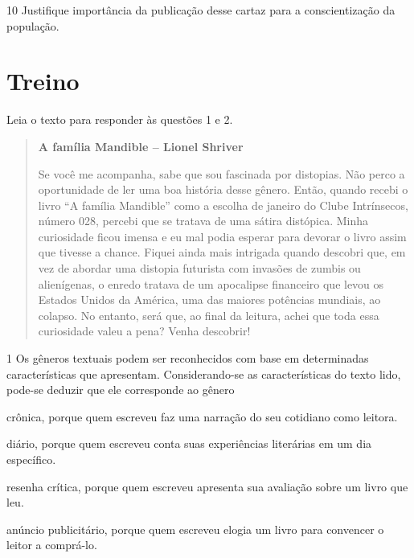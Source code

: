 \num{10} Justifique importância da publicação desse cartaz para a
conscientização da população.


\section{Treino}

Leia o texto para responder às questões 1 e 2.

\begin{quote}
\centering\textbf{A família Mandible -- Lionel Shriver}


Se você me acompanha, sabe que sou fascinada por distopias. Não perco a
oportunidade de ler uma boa história desse gênero. Então, quando recebi
o livro ``A família Mandible'' como a escolha de janeiro do Clube
Intrínsecos, número 028, percebi que se tratava de uma sátira distópica.
Minha curiosidade ficou imensa e eu mal podia esperar para devorar o
livro assim que tivesse a chance. Fiquei ainda mais intrigada quando
descobri que, em vez de abordar uma distopia futurista com invasões de
zumbis ou alienígenas, o enredo tratava de um apocalipse financeiro que
levou os Estados Unidos da América, uma das maiores potências mundiais,
ao colapso. No entanto, será que, ao final da leitura, achei que toda
essa curiosidade valeu a pena? Venha descobrir!

\end{quote}

\num{1} Os gêneros textuais podem ser reconhecidos com base em
determinadas características que apresentam. Considerando-se as
características do texto lido, pode-se deduzir que ele corresponde ao gênero

\begin{escolha}
\item
  crônica, porque quem escreveu faz uma narração do seu cotidiano como
  leitora.
\item
  diário, porque quem escreveu conta suas experiências literárias em um
  dia específico.
\item
  resenha crítica, porque quem escreveu apresenta sua avaliação sobre um
  livro que leu.
\item
  anúncio publicitário, porque quem escreveu elogia um livro para
  convencer o leitor a comprá-lo.
\end{escolha}

